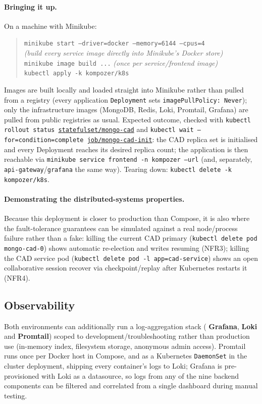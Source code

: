 \begin{sloppypar}
\paragraph{Bringing it up.} On a machine with Minikube:
\begin{quote}
\texttt{minikube start --driver=docker --memory=6144 --cpus=4}\\
\emph{(build every service image directly into Minikube's Docker store)}\\
\texttt{minikube image build ...} \emph{(once per service/frontend image)}\\
\texttt{kubectl apply -k kompozer/k8s}
\end{quote}
Images are built locally and loaded straight into Minikube rather than
pulled from a registry (every application \texttt{Deployment} sets
\texttt{imagePullPolicy: Never}); only the infrastructure images (MongoDB,
Redis, Loki, Promtail, Grafana) are pulled from public registries as usual.
Expected outcome, checked with \texttt{kubectl rollout status
\url{statefulset/mongo-cad}} and \texttt{kubectl wait
--for=condition=complete \url{job/mongo-cad-init}}: the CAD replica set is
initialised and every Deployment reaches its desired replica count; the
application is then reachable via \texttt{minikube service frontend -n
kompozer --url} (and, separately, \texttt{api-gateway}/\texttt{grafana} the
same way). Tearing down: \texttt{kubectl delete -k kompozer/k8s}.
\end{sloppypar}

\paragraph{Demonstrating the distributed-systems properties.} Because this
deployment is closer to production than Compose, it is also where the
fault-tolerance guarantees can be simulated against
a real node/process failure rather than a fake: killing the current CAD
primary (\texttt{kubectl delete pod mongo-cad-0}) shows automatic re-election
and writes resuming (NFR3); killing the CAD service pod (\texttt{kubectl
delete pod -l app=cad-service}) shows an open collaborative session recover
via checkpoint/replay after Kubernetes restarts it (NFR4).

\subsection{Observability}\label{deployment-observability}

Both environments can additionally run a log-aggregation stack (
\textbf{Grafana}, \textbf{Loki} and \textbf{Promtail}) scoped
to development/troubleshooting rather than production use (in-memory index,
filesystem storage, anonymous admin access). Promtail runs once per Docker
host in Compose, and as a Kubernetes
\texttt{DaemonSet} in the cluster deployment, shipping every
container's logs to Loki; Grafana is pre-provisioned with Loki as a
datasource, so logs from any of the nine backend components can be filtered
and correlated from a single dashboard during manual testing.

